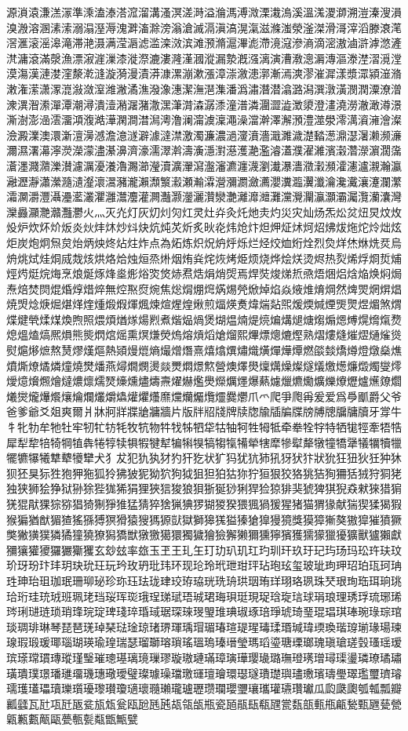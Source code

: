 源溑溒溓溔溕準溗溘溙溚溛溜溝溞溟溠溡溢溣溤溥溦溧溨溩溪溫溬溭溮溯溰溱溲溳溴溵溶溷溸溹溺溻溼溽溾溿滀滁滂滃滄滅滆滇滈滉滊滋滌滍滎滏滐滑滒滓滔滕滖滗滘滙滚滛滜滝滞滟滠满滢滣滤滥滦滧滨滩滪滫滬滭滮滯滰滱滲滳滴滵滶滷滸滹滺滻滼滽滾滿漀漁漂漃漄漅漆漇漈漉漊漋漌漍漎漏漐漑漒漓演漕漖漗漘漙漚漛漜漝漞漟漠漡漢漣漤漥漦漧漨漩漪漫漬漭漮漯漰漱漲漳漴漵漶漷漸漹漺漻漼漽漾漿潀潁潂潃潄潅潆潇潈潉潊潋潌潍潎潏潐潑潒潓潔潕潖潗潘潙潚潛潜潝潞潟潠潡潢潣潤潥潦潧潨潩潪潫潬潭潮潯潰潱潲潳潴潵潶潷潸潹潺潻潼潽潾潿澀澁澂澃澄澅澆澇澈澉澊澋澌澍澎澏澐澑澒澓澔澕澖澗澘澙澚澛澜澝澞澟澠澡澢澣澤澥澦澧澨澩澪澫澬澭澮澯澰澱澲澳澴澵澶澷澸澹澺澻澼澽澾澿激濁濂濃濄濅濆濇濈濉濊濋濌濍濎濏濐濑濒濓濔濕濖濗濘濙濚濛濜濝濞濟濠濡濢濣濤濥濦濧濨濩濪濫濬濭濮濯濰濱濲濳濴濵濶濷濸濹濺濻濼濽濾濿瀀瀁瀂瀃瀄瀅瀆瀇瀈瀉瀊瀋瀌瀍瀎瀏瀐瀑瀒瀓瀔瀕瀖瀗瀘瀙瀚瀛瀜瀝瀞瀟瀠瀡瀢瀣瀤瀥瀦瀧瀨瀩瀪瀫瀬瀭瀮瀯瀰瀱瀲瀳瀴瀵瀶瀷瀸瀹瀺瀻瀼瀽瀾瀿灀灁灂灃灄灅灆灇灈灉灊灋灌灍灎灏灐灑灒灓灔灕灖灗灘灙灚灛灜灝灞灟灠灡灢灣灤灥灦灧灨灩灪火灬灭灮灯灰灱灲灳灴灵灶灷灸灹灺灻灼災灾灿炀炁炂炃炄炅炆炇炈炉炊炋炌炍炎炏炐炑炒炓炔炕炖炗炘炙炚炛炜炝炞炟炠炡炢炣炤炥炦炧炨炩炪炫炬炭炮炯炰炱炲炳炴炵炶炷炸点為炻炼炽炾炿烀烁烂烃烄烅烆烇烈烉烊烋烌烍烎烏烐烑烒烓烔烕烖烗烘烙烚烛烜烝烞烟烠烡烢烣烤烥烦烧烨烩烪烫烬热烮烯烰烱烲烳烴烵烶烷烸烹烺烻烼烽烾烿焀焁焂焃焄焅焆焇焈焉焊焋焌焍焎焏焐焑焒焓焔焕焖焗焘焙焚焛焜焝焞焟焠無焢焣焤焥焦焧焨焩焪焫焬焭焮焯焰焱焲焳焴焵然焷焸焹焺焻焼焽焾焿煀煁煂煃煄煅煆煇煈煉煊煋煌煍煎煏煐煑煒煓煔煕煖煗煘煙煚煛煜煝煞煟煠煡煢煣煤煥煦照煨煩煪煫煬煭煮煯煰煱煲煳煴煵煶煷煸煹煺煻煼煽煾煿熀熁熂熃熄熅熆熇熈熉熊熋熌熍熎熏熐熑熒熓熔熕熖熗熘熙熚熛熜熝熞熟熠熡熢熣熤熥熦熧熨熩熪熫熬熭熮熯熰熱熲熳熴熵熶熷熸熹熺熻熼熽熾熿燀燁燂燃燄燅燆燇燈燉燊燋燌燍燎燏燐燑燒燓燔燕燖燗燘燙燚燛燜燝燞營燠燡燢燣燤燥燦燧燨燩燪燫燬燭燮燯燰燱燲燳燴燵燶燷燸燹燺燻燼燽燾燿爀爁爂爃爄爅爆爇爈爉爊爋爌爍爎爏爐爑爒爓爔爕爖爗爘爙爚爛爜爝爞爟爠爡爢爣爤爥爦爧爨爩爪爫爬爭爮爯爰爱爲爳爴爵父爷爸爹爺爻爼爽爾爿牀牁牂牃牄牅牆片版牉牊牋牌牍牎牏牐牑牒牓牔牕牖牗牘牙牚牛牜牝牞牟牠牡牢牣牤牥牦牧牨物牪牫牬牭牮牯牰牱牲牳牴牵牶牷牸特牺牻牼牽牾牿犀犁犂犃犄犅犆犇犈犉犊犋犌犍犎犏犐犑犒犓犔犕犖犗犘犙犚犛犜犝犞犟犠犡犢犣犤犥犦犧犨犩犪犫犬犭犮犯犰犱犲犳犴犵状犷犸犹犺犻犼犽犾犿狀狁狂狃狄狅狆狇狈狉狊狋狌狍狎狏狐狑狒狓狔狕狖狗狘狙狚狛狜狝狞狟狠狡狢狣狤狥狦狧狨狩狪狫独狭狮狯狰狱狲狳狴狵狶狷狸狹狺狻狼狽狾狿猀猁猂猃猄猅猆猇猈猉猊猋猌猍猎猏猐猑猒猓猔猕猖猗猘猙猚猛猜猝猞猟猠猡猢猣猤猥猦猧猨猩猪猫猬猭献猯猰猱猲猳猴猵猶猷猸猹猺猻猼猽猾猿獀獁獂獃獄獅獆獇獈獉獊獋獌獍獎獏獐獑獒獓獔獕獖獗獘獙獚獛獜獝獞獟獠獡獢獣獤獥獦獧獨獩獪獫獬獭獮獯獰獱獲獳獴獵獶獷獸獹獺獻獼獽獾獿玀玁玂玃玄玅玆率玈玉玊王玌玍玎玏玐玑玒玓玔玕玖玗玘玙玚玛玜玝玞玟玠玡玢玣玤玥玦玧玨玩玪玫玬玭玮环现玱玲玳玴玵玶玷玸玹玺玻玼玽玾玿珀珁珂珃珄珅珆珇珈珉珊珋珌珍珎珏珐珑珒珓珔珕珖珗珘珙珚珛珜珝珞珟珠珡珢珣珤珥珦珧珨珩珪珫珬班珮珯珰珱珲珳珴珵珶珷珸珹珺珻珼珽現珿琀琁琂球琄琅理琇琈琉琊琋琌琍琎琏琐琑琒琓琔琕琖琗琘琙琚琛琜琝琞琟琠琡琢琣琤琥琦琧琨琩琪琫琬琭琮琯琰琱琲琳琴琵琶琷琸琹琺琻琼琽琾琿瑀瑁瑂瑃瑄瑅瑆瑇瑈瑉瑊瑋瑌瑍瑎瑏瑐瑑瑒瑓瑔瑕瑖瑗瑘瑙瑚瑛瑜瑝瑞瑟瑠瑡瑢瑣瑤瑥瑦瑧瑨瑩瑪瑫瑬瑭瑮瑯瑰瑱瑲瑳瑴瑵瑶瑷瑸瑹瑺瑻瑼瑽瑾瑿璀璁璂璃璄璅璆璇璈璉璊璋璌璍璎璏璐璑璒璓璔璕璖璗璘璙璚璛璜璝璞璟璠璡璢璣璤璥璦璧璨璩璪璫璬璭璮璯環璱璲璳璴璵璶璷璸璹璺璻璼璽璾璿瓀瓁瓂瓃瓄瓅瓆瓇瓈瓉瓊瓋瓌瓍瓎瓏瓐瓑瓒瓓瓔瓕瓖瓗瓘瓙瓚瓛瓜瓝瓞瓟瓠瓡瓢瓣瓤瓥瓦瓧瓨瓩瓪瓫瓬瓭瓮瓯瓰瓱瓲瓳瓴瓵瓶瓷瓸瓹瓺瓻瓼瓽瓾瓿甀甁甂甃甄甅甆甇甈甉甊甋甌甍甎甏甐甑甒甓